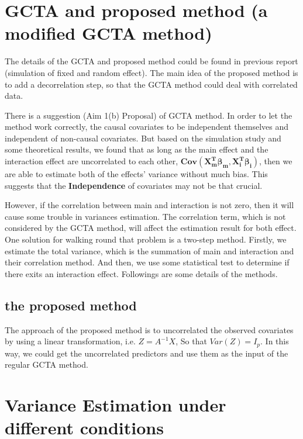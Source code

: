 \documentclass[]{article}
\begin{document}
\section{GCTA and proposed method (a modified GCTA
method)}\label{gcta-and-proposed-method-a-modified-gcta-method}

The details of the GCTA and proposed method could be found in previous
report (simulation of fixed and random effect). The main idea of the
proposed method is to add a decorrelation step, so that the GCTA method
could deal with correlated data.

There is a suggestion (Aim 1(b) Proposal) of GCTA method. In order to
let the method work correctly, the causal covariates to be independent
themselves and independent of non-causal covariates. But based on the
simulation study and some theoretical results, we found that as long as
the main effect and the interaction effect are uncorrelated to each
other, \(\mathbf{Cov(X_m^T\beta_{m}, X_i^T\beta_i)}\), then we are able
to estimate both of the effects' variance without much bias. This
suggests that the \textbf{Independence} of covariates may not be that
crucial.

However, if the correlation between main and interaction is not zero,
then it will cause some trouble in variances estimation. The correlation
term, which is not considered by the GCTA method, will affect the
estimation result for both effect. One solution for walking round that
problem is a two-step method. Firstly, we estimate the total variance,
which is the summation of main and interaction and their correlation
method. And then, we use some statistical test to determine if there
exits an interaction effect. Followings are some details of the methods.

\subsection{the proposed method}\label{the-proposed-method}

The approach of the proposed method is to uncorrelated the observed
covariates by using a linear transformation, i.e. \(Z = A^{-1}X\), So
that \(Var(Z) = I_p\). In this way, we could get the uncorrelated
predictors and use them as the input of the regular GCTA method.

\section{Variance Estimation under different
conditions}\label{variance-estimation-under-different-conditions}
\end{document}
